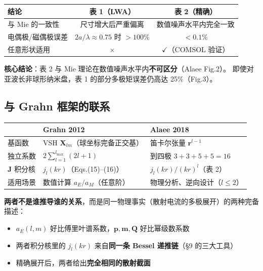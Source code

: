 \begin{center}
\begin{tabular}{lcc}
\toprule
\textbf{结论} & \textbf{表 1（LWA）} & \textbf{表 2（精确）} \\
\midrule
与 Mie 的一致性 & 尺寸增大后严重偏离 & 数值噪声水平内完全一致 \\
电偶极/磁偶极误差 & $2a/\lambda\approx0.75$ 时 $>100\%$ & $<0.1\%$ \\
任意形状适用 & $\times$ & $\checkmark$（COMSOL 验证） \\
\bottomrule
\end{tabular}
\end{center}

\begin{nontrivial}
\textbf{核心结论}：表 2 与 Mie 理论在数值噪声水平内\textbf{不可区分}（Alaee Fig.2）。
即使对亚波长非球形纳米盘，表 1 的部分多极矩误差仍高达 25\%（Fig.3）。
\end{nontrivial}

\subsection{与 Grahn 框架的联系}

\begin{center}
\begin{tabular}{lll}
\toprule
& \textbf{Grahn 2012} & \textbf{Alaee 2018} \\
\midrule
基函数 & VSH $\mathbf{X}_{lm}$（球坐标完备正交基） & 笛卡尔张量 $\mathbf{r}^{l-1}$ \\
独立系数 & $2\sum_{l=1}^{l_{\max}}(2l+1)$ & 到四极 $3+3+5+5=16$ \\
$\mathbf{J}$ 积分核 & $j_l(kr)$（Eqs.(15)--(16)） & $j_l(kr)/(kr)^l$（表 2） \\
适用场景 & 数值计算 $a_E/a_M$（任意阶） & 物理分析、逆向设计（$l\le2$） \\
\bottomrule
\end{tabular}
\end{center}

\begin{noteworthy}
\textbf{两者不是谁推导谁的关系}，而是同一物理事实（散射电流的多极展开）的两种完备描述：
\begin{itemize}
  \item $a_E(l,m)$ 好比傅里叶谱系数，$\mathbf{p},\mathbf{m},\mathbf{Q}$ 好比幂级数系数
  \item 两者积分核里的 $j_l(kr)$ 来自\textbf{同一条 Bessel 递推链}（\S9 的三大工具）
  \item 精确展开后，两者给出\textbf{完全相同的散射截面}
\end{itemize}
\end{noteworthy}

